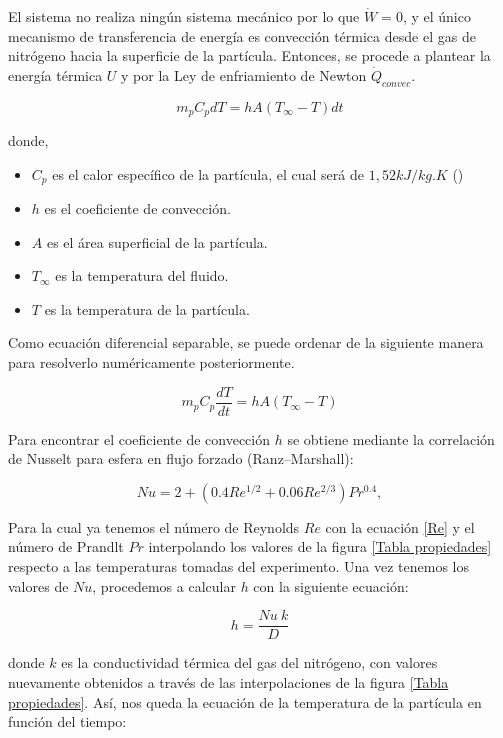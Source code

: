 \documentclass[11pt,stdletter,orderfromtodate,sigleft,twoside]{report}
\begin{document}
El sistema no realiza ningún sistema mecánico por lo que $\dot{W}=0$, y el único mecanismo de transferencia de energía es convección térmica desde el gas de nitrógeno hacia la superficie de la partícula. Entonces, se procede a plantear la energía térmica $U$ y por la Ley de enfriamiento 
 de Newton $\dot{Q}_{convec}$.

\begin{equation}
    m_{p}C_{p}dT=hA(T_{\infty }-T)dt
\end{equation}

donde, 

\begin{itemize}
    \item $C_p$ es el calor específico de la partícula, el cual será de $1,52 kJ/kg.K$ (\cite{hornoRotatorio})
    \item $h$ es el coeficiente de convección.
    \item $A$ es el área superficial de la partícula.
    \item $T_{\infty }$ es la temperatura del fluido.
    \item $T$ es la temperatura de la partícula.
\end{itemize}

Como ecuación diferencial separable, se puede ordenar de la siguiente manera para resolverlo numéricamente posteriormente.

\begin{equation}
    m_{p}C_{p}\frac{dT}{dt}=hA(T_{\infty }-T)
    \label{convec}
\end{equation}

Para encontrar el coeficiente de convección $h$ se obtiene mediante la correlación de Nusselt para esfera en flujo forzado (Ranz–Marshall):

\begin{equation}
    Nu= 2+(0.4Re^{1/2}+0.06Re^{2/3})Pr^{0.4}, 
    \label{Nu}
\end{equation}

Para la cual ya tenemos el número de Reynolds $Re$ con la ecuación \ref{Re} y el número de Prandlt $Pr$ interpolando los valores de la figura \ref{Tabla propiedades} respecto a las temperaturas tomadas del experimento. Una vez tenemos los valores de $Nu$, procedemos a calcular $h$ con la siguiente ecuación:

\begin{equation}
    h=\frac{Nu \ k}{D}
    \label{h}
\end{equation}

donde $k$ es la conductividad térmica del gas del nitrógeno, con valores nuevamente obtenidos a través de las interpolaciones de la figura \ref{Tabla propiedades}. Así, nos queda la ecuación de la temperatura de la partícula en función del tiempo:
\end{document}
